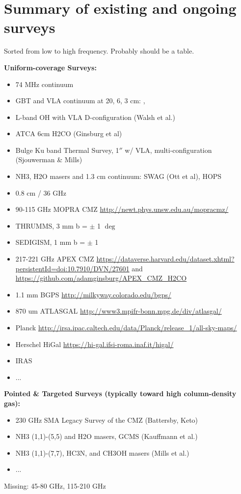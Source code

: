 \section{Summary of existing and ongoing surveys}
Sorted from low to high frequency.  Probably should be a table.

{\bf Uniform-coverage Surveys:}
\begin{itemize}
    \item 74 MHz continuum \citep{Yusef-Zadeh2013c}
    \item GBT and VLA continuum at 20, 6, 3 cm: \citet{Law2008a}, \citet{Law2008b}
    \item L-band OH with VLA D-configuration (Walsh et al.)
    \item ATCA 6cm H2CO (Ginsburg et al)
    \item Bulge Ku band Thermal Survey, 1$''$ w/ VLA, multi-configuration (Sjouwerman \& Mills)
    \item NH3, H2O masers and 1.3 cm continuum: SWAG (Ott et al), HOPS \citep{Walsh2011a}
    \item 0.8 cm / 36 GHz \citep{Yusef-Zadeh2013a}
    \item 90-115 GHz MOPRA CMZ \url{http://newt.phys.unsw.edu.au/mopracmz/} \citep{Jones2012a}
    \item THRUMMS, 3 mm b = $\pm$ 1 $\deg$
    \item SEDIGISM, 1 mm b = $\pm$ 1 \degr
    \item 217-221 GHz APEX CMZ \url{https://dataverse.harvard.edu/dataset.xhtml?persistentId=doi:10.7910/DVN/27601} and \url{https://github.com/adamginsburg/APEX_CMZ_H2CO}
    \item 1.1 mm BGPS \url{http://milkyway.colorado.edu/bgps/}
    \item 870 um ATLASGAL \url{http://www3.mpifr-bonn.mpg.de/div/atlasgal/}
    \item Planck \url{http://irsa.ipac.caltech.edu/data/Planck/release_1/all-sky-maps/}
    \item Herschel HiGal \url{https://hi-gal.ifsi-roma.inaf.it/higal/}
    \item IRAS
    \item ...
\end{itemize}

{\bf Pointed & Targeted Surveys (typically toward high column-density gas):}
\begin{itemize}
    \item 230 GHz SMA Legacy Survey of the CMZ (Battersby, Keto)
    \item NH3 (1,1)-(5,5) and H2O masers, GCMS (Kauffmann et al.)
    \item NH3 (1,1)-(7,7), HC3N, and CH3OH masers (Mills et al.)
    \item ...
\end{itemize}

Missing: 45-80 GHz, 115-210 GHz